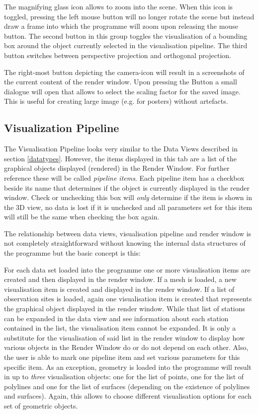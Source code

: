 The magnifying glass icon allows to zoom into the scene. When this icon is toggled, pressing the left mouse button will no longer rotate the scene but instead draw a frame into which the programme will zoom upon releasing the mouse button. The second button in this group toggles the visualisation of a bounding box around the object currently selected in the visualisation pipeline. The third button switches between perspective projection and orthogonal projection.

The right-most button depicting the camera-icon will result in a screenshots of the current content of the render window. Upon pressing the Button a small dialogue will open that allows to select the scaling factor for the saved image. This is useful for creating large image (e.g. for posters) without artefacts.

\subsection{Visualization Pipeline}

The Visualisation Pipeline looks very similar to the Data Views described in section \ref{datatypes}. However, the items displayed in this tab are a list of the graphical objects displayed (rendered) in the Render Window. For further reference these will be called \emph{pipeline items}. Each pipeline item has a checkbox beside its name that determines if the object is currently displayed in the render window. Check or unchecking this box will \emph{only} determine if the item is shown in the 3D view, no data is lost if it is unchecked and all parameters set for this item will still be the same when checking the box again.

The relationship between data views, visualisation pipeline and render window is not completely straightforward without knowing the internal data structures of the programme but the basic concept is this:

For each data set loaded into the programme one or more visualisation items are created and then displayed in the render window. If a mesh is loaded, a new visualisation item is created and displayed in the render window. If a list of observation sites is loaded, again one visualisation item is created that represents the graphical object displayed in the render window. While that list of stations can be expanded in the data view and see information about each station contained in the list, the visualisation item cannot be expanded. It is only a substitute for the visualisation of said list in the render window to display how various objects in the Render Window do or do not depend on each other. Also, the user is able to mark one pipeline item and set various parameters for this specific item. As an exception, geometry is loaded into the programme will result in up to \emph{three} visualisation objects: one for the list of points, one for the list of polylines and one for the list of surfaces (depending on the existence of polylines and surfaces). Again, this allows to choose different visualisation options for each set of geometric objects.

